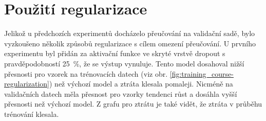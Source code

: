 \documentclass[FM,BP]{tulthesis}
\begin{document}
\begin{table}[htb]
\centering
\caption{Přehled nejlepších výsledků pro různý počet emocí}
\label{tab:best_results}
\end{table}
\FloatBarrier

\section{Použití regularizace} %
Jelikož u předchozích experimentů docházelo přeučování na validační sadě, bylo vyzkoušeno několik způsobů regularizace s cílem omezení přeučování. U prvního experimentu byl přidán za aktivační funkce ve skryté vrstvě dropout s pravděpodobností \mbox{25 \%}, že se výstup vynuluje. Tento model dosahoval nižší přesnosti pro vzorek na trénovacích datech (viz obr. \mbox{\ref{fig:training_course-regularization}}) než výchozí model a ztráta klesala pomaleji. Nicméně na validačních datech měla přesnost pro vzorky tendenci růst a dosáhla vyšší přesnosti než výchozí model. Z grafu pro ztrátu je také vidět, že ztráta v průběhu trénování klesala.
\end{document}
